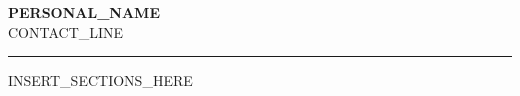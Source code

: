 \documentclass[letterpaper,10pt]{article}
\begin{document}
\begin{flushleft}
    {\Huge\bfseries {{PERSONAL_NAME}}} \\ \vspace{6pt}
    {\small\color{soft-grey} {{CONTACT_LINE}}}
    \\ \vspace{2pt}
    {\color{accent}\rule{\textwidth}{1.4pt}}
\end{flushleft}
\vspace{4pt}

{{INSERT_SECTIONS_HERE}}
\end{document}

